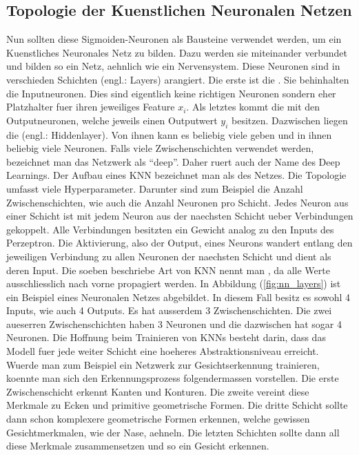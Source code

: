 \subsection{Topologie der Kuenstlichen Neuronalen Netzen}
Nun sollten diese Sigmoiden-Neuronen als Bausteine verwendet werden, um ein Kuenstliches
Neuronales Netz zu bilden. Dazu werden sie miteinander verbundet und bilden so ein Netz,
aehnlich wie ein Nervensystem.
Diese Neuronen sind in verschieden Schichten (engl.: Layers)
arangiert. Die erste ist die . Sie behinhalten die
Inputneuronen. Dies sind eigentlich keine richtigen
Neuronen sondern eher Platzhalter fuer ihren jeweiliges Feature $x_i$. Als letztes kommt die
 mit den Outputneuronen, welche jeweils einen Outputwert $y_i$
besitzen. Dazwischen liegen die  (engl.: Hiddenlayer). Von ihnen kann es
beliebig viele geben und in ihnen beliebig viele Neuronen.
Falls viele Zwischenschichten verwendet werden, bezeichnet man das Netzwerk als
``deep''. Daher ruert auch der Name des Deep Learnings.
Der Aufbau eines KNN bezeichnet man als  des Netzes. Die
Topologie umfasst viele Hyperparameter. Darunter sind zum Beispiel die Anzahl Zwischenschichten, wie auch
die Anzahl Neuronen pro Schicht.
\para{}
Jedes Neuron aus einer Schicht ist mit jedem Neuron aus der naechsten Schicht ueber
Verbindungen gekoppelt. Alle Verbindungen besitzten ein Gewicht analog zu den Inputs des
Perzeptron. Die Aktivierung, also der Output, eines Neurons wandert entlang den jeweiligen
Verbindung zu allen Neuronen der naechsten Schicht und dient als deren Input.
Die soeben beschriebe Art von KNN nennt man , da alle Werte
ausschliesslich nach vorne propagiert werden.
\para{}
In Abbildung (\ref{fig:nn_layers}) ist ein Beispiel eines Neuronalen Netzes
abgebildet. In diesem Fall besitz es sowohl 4 Inputs, wie auch 4 Outputs. Es hat
ausserdem 3 Zwischenschichten. Die zwei aueserren Zwischenschichten haben 3 Neuronen und die dazwischen
hat sogar 4 Neuronen.
\para{}
Die Hoffnung beim Trainieren von KNNs besteht darin, dass das Modell fuer jede
weiter Schicht eine hoeheres Abstraktionsniveau erreicht. Wuerde man zum
Beispiel ein Netzwerk zur Gesichtserkennung trainieren, koennte man sich den
Erkennungsprozess folgendermassen vorstellen. Die erste Zwischenschicht erkennt
Kanten und Konturen. Die zweite vereint diese Merkmale zu Ecken und primitive
geometrische Formen. Die dritte Schicht sollte dann schon komplexere
geometrische Formen erkennen, welche gewissen Gesichtmerkmalen, wie der Nase, aehneln. Die letzten Schichten sollte dann all diese
Merkmale zusammensetzen und so ein Gesicht erkennen.

